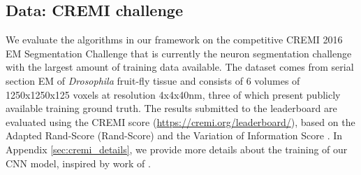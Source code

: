 

\subsection{Data: CREMI challenge} \label{sec:cremi_challenge}
We evaluate the algorithms in our framework on the competitive CREMI 2016 EM Segmentation Challenge \cite{cremiChallenge} that is currently the neuron segmentation challenge with the largest amount of training data available. The dataset comes from serial section EM of \emph{Drosophila} fruit-fly tissue and consists of 6 volumes of 1250x1250x125 voxels at resolution 4x4x40nm, three of which present publicly available training ground truth. The results submitted to the leaderboard are evaluated using the CREMI score (\url{https://cremi.org/leaderboard/}), based on the Adapted Rand-Score (Rand-Score) and the Variation of Information Score \cite{arganda2015crowdsourcing}. In Appendix \ref{sec:cremi_details}, we provide more details about the training of our CNN model, inspired by work of \cite{lee2017superhuman,funke2018large}.




